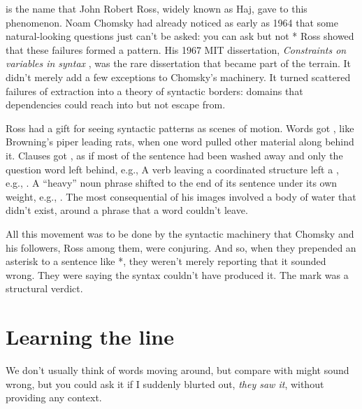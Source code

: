  is the name that John Robert Ross, widely known as Haj, gave to this phenomenon. Noam Chomsky had already noticed as early as 1964 that some natural-looking questions just can't be asked: you can ask  but not * Ross showed that these failures formed a pattern. His 1967 MIT dissertation, \textit{Constraints on variables in syntax} \citep{Ross1967}, was the rare dissertation that became part of the terrain. It didn't merely add a few exceptions to Chomsky's machinery. It turned scattered failures of extraction into a theory of syntactic borders: domains that dependencies could reach into but not escape from.


Ross had a gift for seeing syntactic patterns as scenes of motion. Words got , like Browning's piper leading rats, when one word pulled other material along behind it. Clauses got , as if most of the sentence had been washed away and only the question word left behind, e.g.,  A verb leaving a coordinated structure left a , e.g., . A \enquote{heavy} noun phrase shifted to the end of its sentence under its own weight, e.g., . The most consequential of his images involved a body of water that didn't exist, around a phrase that a word couldn't leave.

All this movement was to be done by the syntactic machinery that Chomsky and his followers, Ross among them, were conjuring. And so, when they prepended an asterisk to a sentence like *, they weren't merely reporting that it sounded wrong. They were saying the syntax couldn't have produced it. The mark was a structural verdict.

\section{Learning the line}

We don't usually think of words moving around, but compare  with   might sound wrong, but you could ask it if I suddenly blurted out, \textit{they saw it}, without providing any context.

